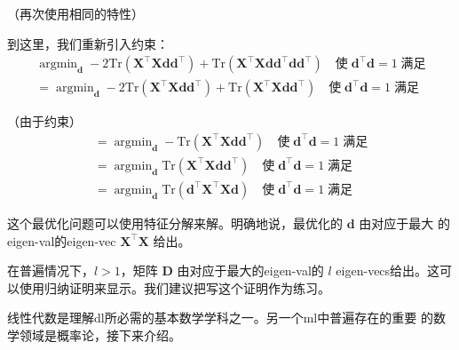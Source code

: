 （再次使用相同的特性）

到这里，我们重新引入约束：
\begin{gather}
  \mathop{\arg\min}_{\pmb{d}} -
  2\mathrm{Tr}(\pmb{X}^{\top}\pmb{X}\pmb{d}\pmb{d}^{\top}) +
  \mathrm{Tr}(\pmb{X}^{\top}\pmb{X}\pmb{d}\pmb{d}^{\top}\pmb{d}\pmb{d}^{\top})
  \quad\text{使}\;\pmb{d}^{\top}\pmb{d} = 1\;\text{满足}\\
  = \mathop{\arg\min}_{\pmb{d}} -
  2\mathrm{Tr}(\pmb{X}^{\top}\pmb{X}\pmb{d}\pmb{d}^{\top}) +
  \mathrm{Tr}(\pmb{X}^{\top}\pmb{X}\pmb{d}\pmb{d}^{\top})
  \quad\text{使}\;\pmb{d}^{\top}\pmb{d} = 1\;\text{满足}
\end{gather}

（由于约束）
\begin{gather}
  = \mathop{\arg\min}_{\pmb{d}} -
  \mathrm{Tr}(\pmb{X}^{\top}\pmb{X}\pmb{d}\pmb{d}^{\top})
  \quad\text{使}\;\pmb{d}^{\top}\pmb{d} = 1\;\text{满足}\\
  = \mathop{\arg\min}_{\pmb{d}} 
  \mathrm{Tr}(\pmb{X}^{\top}\pmb{X}\pmb{d}\pmb{d}^{\top})
  \quad\text{使}\;\pmb{d}^{\top}\pmb{d} = 1\;\text{满足}\\
  = \mathop{\arg\min}_{\pmb{d}} 
  \mathrm{Tr}(\pmb{d}^{\top}\pmb{X}^{\top}\pmb{X}\pmb{d})
  \quad\text{使}\;\pmb{d}^{\top}\pmb{d} = 1\;\text{满足}
\end{gather}

这个最优化问题可以使用特征分解来解。明确地说，最优化的 $\pmb{d}$ 由对应于最大
的\gls*{eigen-val}的\gls*{eigen-vec} $\pmb{X}^{\top}\pmb{X}$ 给出。

在普遍情况下，$l > 1$，矩阵 $\pmb{D}$ 由对应于最大的\gls*{eigen-val}的 $l$
\gls*{eigen-vecs}给出。这可以使用归纳证明来显示。我们建议把写这个证明作为练习。

线性代数是理解\gls*{dl}所必需的基本数学学科之一。另一个\gls*{ml}中普遍存在的重要
的数学领域是概率论，接下来介绍。
